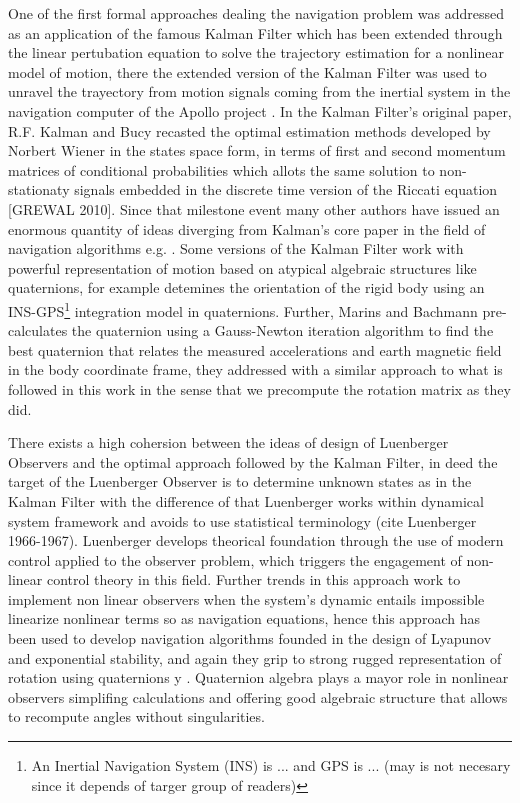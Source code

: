 \documentclass[conference]{IEEEtran}
\begin{document}
One of the first formal approaches dealing the navigation problem was addressed as an application of the famous Kalman Filter which has been extended through the linear pertubation equation to solve the trajectory estimation for a nonlinear model of motion, there the extended version of the Kalman Filter was used to unravel the trayectory from motion signals coming from the inertial system in the navigation computer of the Apollo project \cite{Schmidt1962}.  In the Kalman Filter's original paper, R.F. Kalman and Bucy recasted the optimal estimation methods developed by Norbert Wiener in the states space form, in terms of first and second momentum matrices of conditional probabilities which allots the same solution to non-stationaty signals embedded in the discrete time version of the Riccati equation [GREWAL 2010]. Since that milestone event many other authors have issued an enormous quantity of ideas diverging from Kalman's core paper in the field of navigation algorithms e.g. \cite{Bistrovs2012, Gandhi2007}. Some versions of the Kalman Filter work with powerful representation of motion based on atypical algebraic structures like quaternions, for example \cite{Sabatini2006} detemines the orientation of the rigid body using an INS-GPS\footnote{An Inertial Navigation System (INS) is ... and GPS is ... (may is not necesary since it depends of targer group of readers) } integration model in quaternions. Further, Marins and Bachmann pre-calculates the quaternion using a Gauss-Newton iteration algorithm to find the best quaternion that relates the measured accelerations and earth magnetic field in the body coordinate frame, they addressed with a similar approach to what is followed in this work in the sense that we precompute the rotation matrix as they did.\par 
%
There exists a high cohersion between the ideas of design of Luenberger Observers and the optimal approach followed by the Kalman Filter, in deed the target of the Luenberger Observer is to determine unknown states as in the Kalman Filter with the difference of that Luenberger works within dynamical system framework  and avoids to use statistical terminology (cite Luenberger 1966-1967). Luenberger develops theorical foundation through the use of modern control applied to the observer problem, which triggers the engagement of  non-linear control theory \cite{Kou1973}\cite{Thau1973} in this field. Further trends in this approach work to implement non linear observers when the system's dynamic entails impossible linearize nonlinear terms so as navigation equations, hence this approach has been used to develop navigation algorithms founded in  the design of Lyapunov and exponential stability, and again they grip to strong rugged representation of rotation using quaternions \cite{Vik2001} \cite{Thienel2003} y \cite{Hua2009}. Quaternion algebra plays a mayor role in nonlinear observers simplifing calculations and offering good algebraic structure that allows to recompute angles without singularities.\par
\end{document}
